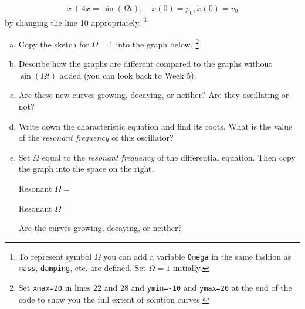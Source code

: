   \begin{sagequestion}
    \begin{equation} \label{eq:w7-1}
      \ddot x + 4 x = \sin( \Omega t ),\quad x(0)=p_{0}, \dot x(0) = v_{0}
    \end{equation}
    by changing the line 10 appropriately. \footnote{To represent symbol \(\Omega\) you can add a variable \texttt{Omega} in the same fashion as \texttt{mass}, \texttt{damping}, etc. are defined. Set \(\Omega=1\) initially.}
    
    \begin{enumerate}[(a)]
      \item Copy the sketch for \(\Omega=1\) into the graph below. \footnote{Set \texttt{xmax=20} in lines 22 and 28 and \texttt{ymin=-10} and \texttt{ymax=20} at the end of the code to show you the full extent of solution curves.}
        
      \item Describe how the graphs are different compared to the graphs without \(\sin(\Omega t)\) added (you can look back to Week 5).
        \solspace{0.25in}
      \item Are these new curves growing, decaying, or neither? Are they oscillating or not?
        \solspace{0.25in}
          
      \item Write down the characteristic equation and find its roots. What is the value of the \emph{resonant frequency} of this oscillator?
        \solspace{.25in}

      \item Set \(\Omega\) equal to the \emph{resonant frequency} of the differential equation. Then copy the graph into the space on the right.

      Resonant \(\Omega = \)
    
      \begin{minipage}{0.48\linewidth}
        \begin{center}
          Resonant \(\Omega = \)


        \end{center}
      \end{minipage}

      Are the curves growing, decaying, or neither? 
    \end{enumerate}

  \end{sagequestion}




